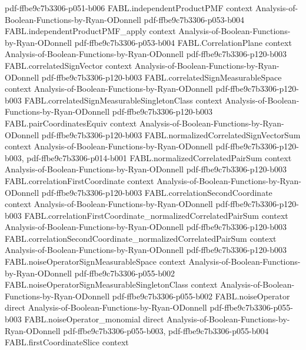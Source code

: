 \begin{theorem}
  {pdf-ffbe9c7b3306-p051-b006}
\proofstep
  {FABL.independentProductPMF}
  {context}
  {Analysis-of-Boolean-Functions-by-Ryan-ODonnell}
  {pdf-ffbe9c7b3306-p053-b004}
\proofstep
  {FABL.independentProductPMF_apply}
  {context}
  {Analysis-of-Boolean-Functions-by-Ryan-ODonnell}
  {pdf-ffbe9c7b3306-p053-b004}
\proofstep
  {FABL.CorrelationPlane}
  {context}
  {Analysis-of-Boolean-Functions-by-Ryan-ODonnell}
  {pdf-ffbe9c7b3306-p120-b003}
\proofstep
  {FABL.correlatedSignVector}
  {context}
  {Analysis-of-Boolean-Functions-by-Ryan-ODonnell}
  {pdf-ffbe9c7b3306-p120-b003}
\proofstep
  {FABL.correlatedSignMeasurableSpace}
  {context}
  {Analysis-of-Boolean-Functions-by-Ryan-ODonnell}
  {pdf-ffbe9c7b3306-p120-b003}
\proofstep
  {FABL.correlatedSignMeasurableSingletonClass}
  {context}
  {Analysis-of-Boolean-Functions-by-Ryan-ODonnell}
  {pdf-ffbe9c7b3306-p120-b003}
\proofstep
  {FABL.pairCoordinatesEquiv}
  {context}
  {Analysis-of-Boolean-Functions-by-Ryan-ODonnell}
  {pdf-ffbe9c7b3306-p120-b003}
\proofstep
  {FABL.normalizedCorrelatedSignVectorSum}
  {context}
  {Analysis-of-Boolean-Functions-by-Ryan-ODonnell}
  {pdf-ffbe9c7b3306-p120-b003,
    pdf-ffbe9c7b3306-p014-b001}
\proofstep
  {FABL.normalizedCorrelatedPairSum}
  {context}
  {Analysis-of-Boolean-Functions-by-Ryan-ODonnell}
  {pdf-ffbe9c7b3306-p120-b003}
\proofstep
  {FABL.correlationFirstCoordinate}
  {context}
  {Analysis-of-Boolean-Functions-by-Ryan-ODonnell}
  {pdf-ffbe9c7b3306-p120-b003}
\proofstep
  {FABL.correlationSecondCoordinate}
  {context}
  {Analysis-of-Boolean-Functions-by-Ryan-ODonnell}
  {pdf-ffbe9c7b3306-p120-b003}
\proofstep
  {FABL.correlationFirstCoordinate_normalizedCorrelatedPairSum}
  {context}
  {Analysis-of-Boolean-Functions-by-Ryan-ODonnell}
  {pdf-ffbe9c7b3306-p120-b003}
\proofstep
  {FABL.correlationSecondCoordinate_normalizedCorrelatedPairSum}
  {context}
  {Analysis-of-Boolean-Functions-by-Ryan-ODonnell}
  {pdf-ffbe9c7b3306-p120-b003}
\proofstep
  {FABL.noiseOperatorSignMeasurableSpace}
  {context}
  {Analysis-of-Boolean-Functions-by-Ryan-ODonnell}
  {pdf-ffbe9c7b3306-p055-b002}
\proofstep
  {FABL.noiseOperatorSignMeasurableSingletonClass}
  {context}
  {Analysis-of-Boolean-Functions-by-Ryan-ODonnell}
  {pdf-ffbe9c7b3306-p055-b002}
\proofstep
  {FABL.noiseOperator}
  {direct}
  {Analysis-of-Boolean-Functions-by-Ryan-ODonnell}
  {pdf-ffbe9c7b3306-p055-b003}
\proofstep
  {FABL.noiseOperator_monomial}
  {direct}
  {Analysis-of-Boolean-Functions-by-Ryan-ODonnell}
  {pdf-ffbe9c7b3306-p055-b003,
    pdf-ffbe9c7b3306-p055-b004}
\proofstep
  {FABL.firstCoordinateSlice}
  {context}

\end{theorem}
